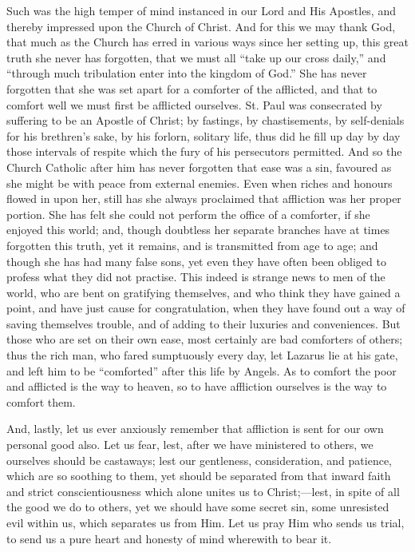 Such was the high temper of mind instanced in our Lord and His
Apostles, and thereby impressed upon the Church of Christ. And for
this we may thank God, that much as the Church has erred in various
ways since her setting up, this great truth she never has forgotten,
that we must all ``take up our cross daily,'' and
``through much tribulation enter into the kingdom of God.''
She has never forgotten that she was set apart for a comforter of the
afflicted, and that to comfort well we must first be afflicted
ourselves. St. Paul was consecrated by suffering to be an Apostle of
Christ; by fastings, by chastisements, by self-denials for his
brethren's sake, by his forlorn, solitary life, thus did he fill up
day by day those intervals of respite which the fury of his
persecutors permitted. And so the Church Catholic after him has never
forgotten that ease was a sin, favoured as she might be with peace
from external enemies. Even when riches and honours flowed in upon
her, still has she always proclaimed that affliction was her proper
portion. She has felt she could not perform the office of a comforter,
if she enjoyed this world; and, though doubtless her separate branches
have at times forgotten this truth, yet it remains, and is transmitted
from age to age; and though she has had many false sons, yet even they
have often been obliged to profess what they did not practise. This
indeed is strange news to men of the world, who are bent on gratifying
themselves, and who think they have gained a point, and have just
cause for congratulation, when they have found out a way of saving
themselves trouble, and of adding to their luxuries and conveniences.
But those who are set on their own ease, most certainly are bad
comforters of others; thus the rich man, who fared sumptuously every
day, let Lazarus lie at his gate, and left him to be
``comforted'' after this life by Angels. As to comfort the
poor and afflicted is the way to heaven, so to have affliction
ourselves is the way to comfort them.

And, lastly, let us ever anxiously remember that affliction is sent
for our own personal good also. Let us fear, lest, after we have
ministered to others, we ourselves should be castaways; lest our
gentleness, consideration, and patience, which are so soothing to
them, yet should be separated from that inward faith and strict
conscientiousness which alone unites us to Christ;—lest, in spite of
all the good we do to others, yet we should have some secret sin, some
unresisted evil within us, which separates us from Him. Let us pray
Him who sends us trial, to send us a pure heart and honesty of mind
wherewith to bear it.


